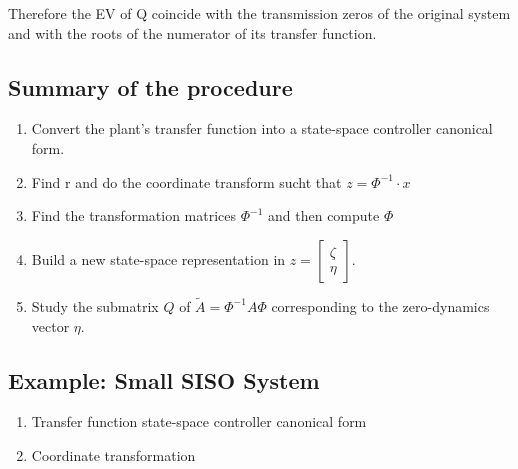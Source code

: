 \documentclass[10pt,a4paper]{scrartcl}
\begin{document}
\begin{multicols*}{3}

Therefore the EV of Q coincide with the transmission zeros of the original system and with the roots of the numerator of its transfer function.


\subsection{Summary of the procedure}

\begin{enumerate}
\ncompaq
\item Convert the plant's transfer function into a state-space controller canonical form.
\item Find r and do the coordinate transform sucht that $z=\Phi^{-1}\cdot x$
\item Find the transformation matrices $\Phi^{-1}$ and then compute $\Phi$
\item Build a new state-space representation in $z=\begin{bmatrix}\zeta\\\eta\end{bmatrix}$.
\item Study the submatrix $Q$ of $\tilde{A}=\Phi^{-1}A\Phi$ corresponding to the zero-dynamics vector $\eta$. 
\end{enumerate}

\subsection{Example: Small SISO System}

\begin{enumerate}[leftmargin=*]
\ncompaq
\item Transfer function \dahe state-space controller canonical form
\item Coordinate transformation


\end{enumerate}
\end{multicols*}
\end{document}
